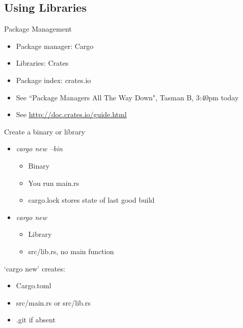 \documentclass[aspectratio=169]{beamer}
\begin{document}
\subsection{Using Libraries}

\begin{frame}
    Package Management
    \begin{itemize}
        \item Package manager: Cargo
        \item Libraries: Crates
        \item Package index: crates.io
        \item See ``Package Managers All The Way Down", Tasman B, 3:40pm today
        \item See \url{http://doc.crates.io/guide.html}
    \end{itemize}
\end{frame}

\begin{frame}
    Create a binary or library
    \begin{itemize}
        \item \textit{cargo new --bin}
            \begin{itemize}
                \item Binary
                \item You run main.rs
                \item cargo.lock stores state of last good build
            \end{itemize}
        \item \textit{cargo new}
            \begin{itemize}
                \item Library
                \item src/lib.rs, no main function
            \end{itemize}
    \end{itemize}
\end{frame}

\begin{frame}
    `cargo new' creates:
    \begin{itemize}
        \item Cargo.toml
        \item src/main.rs or src/lib.rs
        \item .git if absent
    \end{itemize}
\end{frame}
\end{document}
